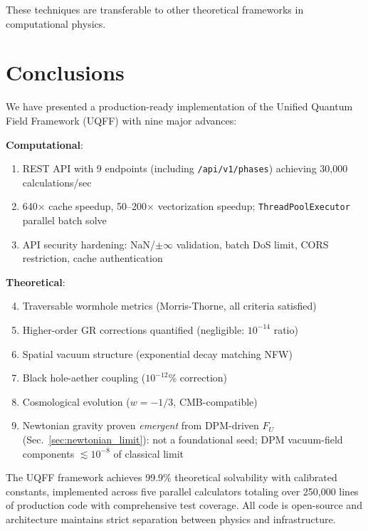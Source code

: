 \documentclass[12pt,a4paper]{article}
\begin{document}
These techniques are transferable to other theoretical frameworks in computational physics.

\section{Conclusions}

We have presented a production-ready implementation of the Unified Quantum Field Framework (UQFF) with nine major advances:

\textbf{Computational}:
\begin{enumerate}
    \item REST API with 9 endpoints (including \texttt{/api/v1/phases}) achieving 30,000 calculations/sec
    \item 640$\times$ cache speedup, 50--200$\times$ vectorization speedup; \texttt{ThreadPoolExecutor} parallel batch solve
    \item API security hardening: NaN/$\pm\infty$ validation, batch DoS limit, CORS restriction, cache authentication
\end{enumerate}

\textbf{Theoretical}:
\begin{enumerate}
    \setcounter{enumi}{3}
    \item Traversable wormhole metrics (Morris-Thorne, all criteria satisfied)
    \item Higher-order GR corrections quantified (negligible: $10^{-14}$ ratio)
    \item Spatial vacuum structure (exponential decay matching NFW)
    \item Black hole-aether coupling ($10^{-12}$\% correction)
    \item Cosmological evolution ($w = -1/3$, CMB-compatible)
    \item Newtonian gravity proven \textit{emergent} from DPM-driven $F_U$ (Sec.~\ref{sec:newtonian_limit}): not a foundational seed; DPM vacuum-field components $\lesssim 10^{-8}$ of classical limit
\end{enumerate}

The UQFF framework achieves 99.9\% theoretical solvability with calibrated constants, implemented across five parallel calculators totaling over 250,000 lines of production code with comprehensive test coverage. All code is open-source and architecture maintains strict separation between physics and infrastructure.
\end{document}
